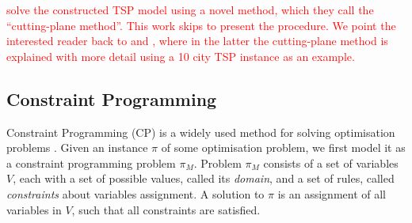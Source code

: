\documentclass{mprop}
\theoremstyle{definition}
\begin{document}



\textcolor{red}{
\citet{Dantzig54} solve the constructed TSP model using a novel method, which they call the ``cutting-plane method''. This work skips to present the procedure. We point the interested reader back to \citep{Dantzig54} and \citep{Dantzig59}, where in the latter the cutting-plane method is explained with more detail using a 10 city TSP instance as an example.
}



\subsection{Constraint Programming}
\label{cp}
Constraint Programming (CP) is a widely used method for solving optimisation problems \citep{Caseau97, Manlove07, Mcdonald02}. Given an instance $\pi$ of some optimisation problem, we first model it as a constraint programming problem $\pi_{M}$. Problem $\pi_{M}$ consists of a set of variables $V$, each with a set of possible values, called its \textit{domain}, and a set of rules, called \textit{constraints} about variables assignment. A solution to $\pi$ is an assignment of all variables in $V$, such that all constraints are satisfied. 
\end{document}
